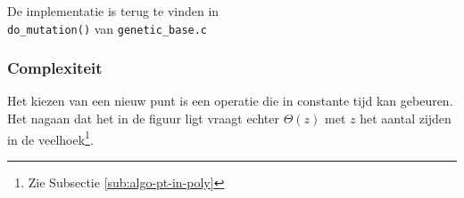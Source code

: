 De implementatie is terug te vinden in \\
\texttt{do\_mutation()} van \texttt{genetic\_base.c}

\subsubsection{Complexiteit}
\label{ssub:MutationComplexity}
Het kiezen van een nieuw punt is een operatie die in constante tijd kan gebeuren. Het nagaan dat het in de figuur ligt vraagt echter $\Theta(z)$ met $z$ het aantal zijden in de veelhoek\footnote{Zie Subsectie \ref{sub:algo-pt-in-poly}}.

%